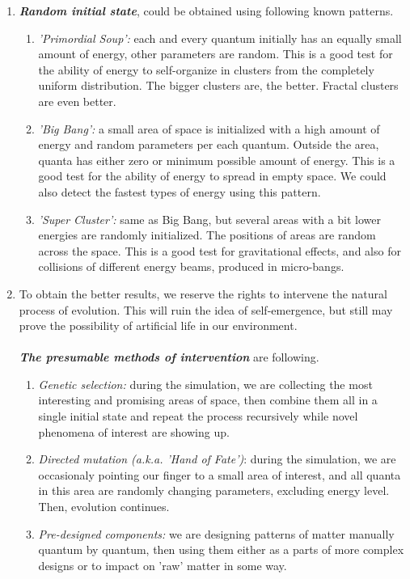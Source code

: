 \documentclass[a4paper,12pt,tikz,UTF8]{article}
\begin{document}
\begin{enumerate}
    \item \textbf{\textit{Random initial state}}, could be obtained using following known patterns.
      \begin{enumerate}
        \item \textit{'Primordial Soup':} each and every quantum initially has an equally small amount of energy, other parameters are random. This is a good test for the ability of energy to self-organize in clusters from the completely uniform distribution. The bigger clusters are, the better. Fractal clusters are even better.
        \item \textit{'Big Bang':} a small area of space is initialized with a high amount of energy and random parameters per each quantum. Outside the area, quanta has either zero or minimum possible amount of energy. This is a good test for the ability of energy to spread in empty space. We could also detect the fastest types of energy using this pattern. 
        \item \textit{'Super Cluster':} same as Big Bang, but several areas with a bit lower energies are randomly initialized. The positions of areas are random across the space. This is a good test for gravitational effects, and also for collisions of different energy beams, produced in micro-bangs.
      \end{enumerate}

    \item To obtain the better results, we reserve the rights to intervene the natural process of evolution. This will ruin the idea of self-emergence, but still may prove the possibility of artificial life in our environment.\\\\
          \textbf{\textit{The presumable methods of intervention}} are following.
      \begin{enumerate}
        \item \textit{Genetic selection:} during the simulation, we are collecting the most interesting and promising areas of space, then combine them all in a single initial state and repeat the process recursively while novel phenomena of interest are showing up.
        \item \textit{Directed mutation (a.k.a. 'Hand of Fate')}: during the simulation, we are occasionaly pointing our finger to a small area of interest, and all quanta in this area are randomly changing parameters, excluding energy level. Then, evolution continues. 
        \item \textit{Pre-designed components:} we are designing patterns of matter manually quantum by quantum, then using them either as a parts of more complex designs or to impact on 'raw' matter in some way.
      \end{enumerate}

  \end{enumerate}
\end{document}
